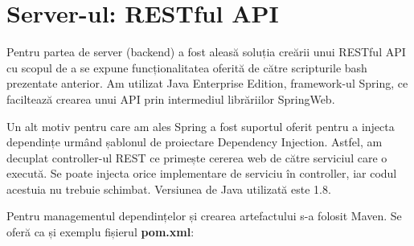 \section{Server-ul: RESTful API}
Pentru partea de server (backend) a fost aleasă soluția creării unui RESTful API cu scopul de a se expune funcționalitatea oferită de către scripturile bash prezentate anterior. Am utilizat Java Enterprise Edition, framework-ul Spring, ce faciltează crearea unui API prin intermediul librăriilor SpringWeb.
\par
Un alt motiv pentru care am ales Spring a fost suportul oferit pentru a injecta dependințe urmând șablonul de proiectare Dependency Injection. Astfel, am decuplat controller-ul REST ce primește cererea web de către serviciul care o execută. Se poate injecta orice implementare de serviciu în controller, iar codul acestuia nu trebuie schimbat. Versiunea de Java utilizată este 1.8.
\newpage
Pentru managementul dependințelor și crearea artefactului s-a folosit Maven. Se oferă ca și exemplu fișierul \textbf{pom.xml}:

\newpage
